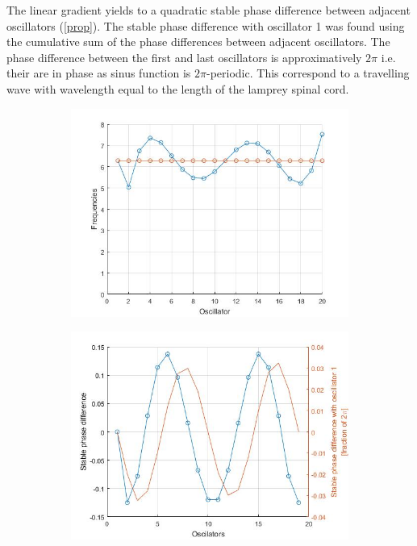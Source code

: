 \documentclass[a4paper]{scrartcl}
\begin{document}
The linear gradient yields to a quadratic stable phase difference between adjacent oscillators (\ref{prop}). The stable phase difference with oscillator 1 was found using the cumulative sum of the phase differences between adjacent oscillators. The phase difference between the first and last oscillators is approximatively $2\pi$ i.e. their are in phase as sinus function is $2\pi$-periodic. This correspond to a travelling wave with wavelength equal to the length of the lamprey spinal cord.

\begin{figure}[h]
	\centering
	\begin{subfigure}[b]{0.49\textwidth}
		\centering
		\includegraphics[width=\textwidth]{results/6.b/standWaveFreq.jpg}
		\caption{}
	\end{subfigure}
	\centering
	\begin{subfigure}[b]{0.49\textwidth}
		\centering
		\includegraphics[width=\textwidth]{results/6.b/standWavePhase.jpg}

\end{subfigure}
\end{figure}
\end{document}
